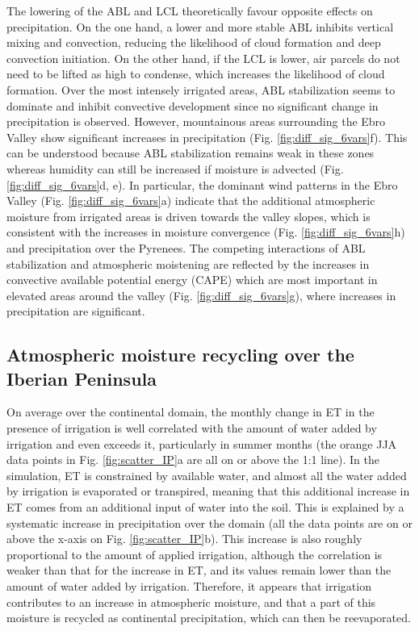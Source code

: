 The lowering of the ABL and LCL theoretically favour opposite effects on precipitation. On the one hand,  a lower and more stable ABL inhibits vertical mixing and convection, reducing the likelihood of cloud formation and deep convection initiation. On the other hand, if the LCL is lower, air parcels do not need to be lifted as high to condense, which increases the likelihood of cloud formation.
Over the most intensely irrigated areas, ABL stabilization seems to dominate and inhibit convective development since no significant change in precipitation is observed.
However, mountainous areas surrounding the Ebro Valley show significant increases in precipitation (Fig. \ref{fig:diff_sig_6vars}f). This can be understood because ABL stabilization remains weak in these zones whereas humidity can still be increased if moisture is advected (Fig. \ref{fig:diff_sig_6vars}d, e). In particular, the dominant wind patterns in the Ebro Valley (Fig. \ref{fig:diff_sig_6vars}a) indicate that the additional atmospheric moisture from irrigated areas is driven towards the valley slopes, which is consistent with the increases in moisture convergence (Fig. \ref{fig:diff_sig_6vars}h) and precipitation over the Pyrenees.
The competing interactions of ABL stabilization and atmospheric moistening are reflected by the increases in convective available potential energy (CAPE) which are most important in elevated areas around the valley (Fig. \ref{fig:diff_sig_6vars}g), where increases in precipitation are significant. 


\subsection{Atmospheric moisture recycling over the Iberian Peninsula}
On average over the continental domain, the monthly change in ET in the presence of irrigation is well correlated with the amount of water added by irrigation and even exceeds it, particularly in summer months (the orange JJA data points in Fig. \ref{fig:scatter_IP}a are all on or above the 1:1 line).
In the simulation, ET is constrained by available water, and almost all the water added by irrigation is evaporated or transpired, meaning that this additional increase in ET comes from an additional input of water into the soil.
This is explained by a systematic increase in precipitation over the domain (all the data points are on or above the x-axis on Fig. \ref{fig:scatter_IP}b). This increase is also roughly proportional to the amount of applied irrigation, although the correlation is weaker than that for the increase in ET, and its values remain lower than the amount of water added by irrigation.
Therefore, it appears that irrigation contributes to an increase in atmospheric moisture, and that a part of this moisture is recycled as continental precipitation, which can then be reevaporated.

